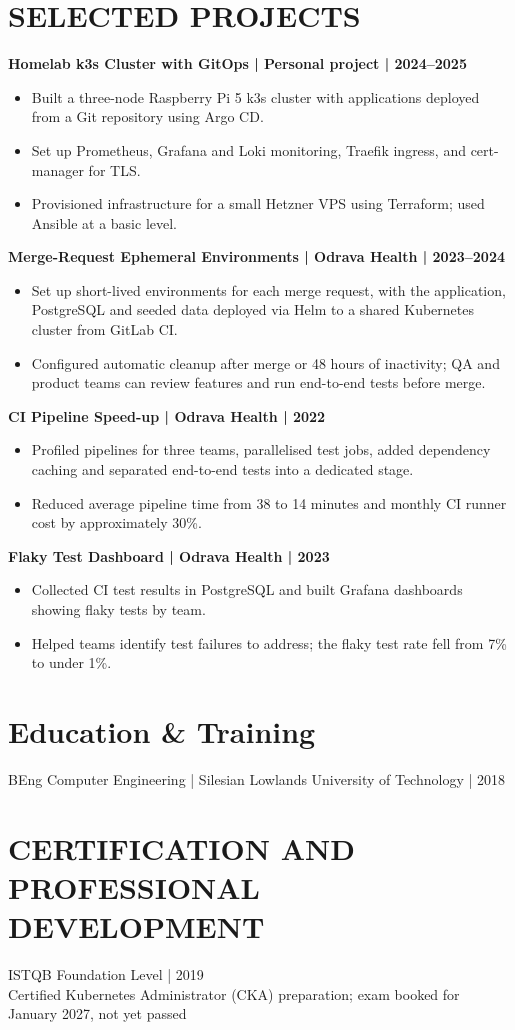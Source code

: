 \documentclass[11pt,a4paper]{article}
\begin{document}
\section*{SELECTED PROJECTS}
\textbf{Homelab k3s Cluster with GitOps | Personal project | 2024--2025}
\begin{itemize}
\item Built a three-node Raspberry Pi 5 k3s cluster with applications deployed from a Git repository using Argo CD.
\item Set up Prometheus, Grafana and Loki monitoring, Traefik ingress, and cert-manager for TLS.
\item Provisioned infrastructure for a small Hetzner VPS using Terraform; used Ansible at a basic level.
\end{itemize}
\textbf{Merge-Request Ephemeral Environments | Odrava Health | 2023--2024}
\begin{itemize}
\item Set up short-lived environments for each merge request, with the application, PostgreSQL and seeded data deployed via Helm to a shared Kubernetes cluster from GitLab CI.
\item Configured automatic cleanup after merge or 48 hours of inactivity; QA and product teams can review features and run end-to-end tests before merge.
\end{itemize}
\textbf{CI Pipeline Speed-up | Odrava Health | 2022}
\begin{itemize}
\item Profiled pipelines for three teams, parallelised test jobs, added dependency caching and separated end-to-end tests into a dedicated stage.
\item Reduced average pipeline time from 38 to 14 minutes and monthly CI runner cost by approximately 30\%.
\end{itemize}
\textbf{Flaky Test Dashboard | Odrava Health | 2023}
\begin{itemize}
\item Collected CI test results in PostgreSQL and built Grafana dashboards showing flaky tests by team.
\item Helped teams identify test failures to address; the flaky test rate fell from 7\% to under 1\%.
\end{itemize}

\section*{Education \& Training}
BEng Computer Engineering | Silesian Lowlands University of Technology | 2018

\section*{CERTIFICATION AND PROFESSIONAL DEVELOPMENT}
ISTQB Foundation Level | 2019\\
Certified Kubernetes Administrator (CKA) preparation; exam booked for January 2027, not yet passed
\end{document}
